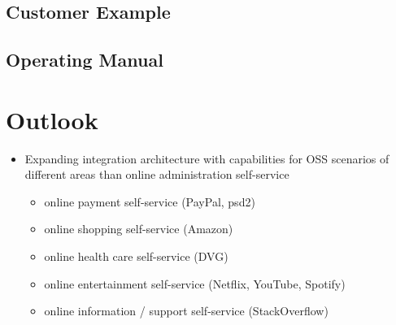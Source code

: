 \documentclass[
     12pt,         %
     a4paper,      %
     BCOR=10mm,version=first,     %
     DIV=14,version=first,        %
     ]{scrreprt}
\begin{document}
\section{Customer Example}

\section{Operating Manual}

\chapter{Outlook}

\begin{itemize}
     \item Expanding integration architecture with capabilities for OSS scenarios of different areas than online administration self-service
     \begin{itemize}
          \item online payment self-service (PayPal, psd2)
          \item online shopping self-service (Amazon)
          \item online health care self-service (DVG)
          \item online entertainment self-service (Netflix, YouTube, Spotify)
          \item online information / support self-service (StackOverflow)
     \end{itemize}
\end{itemize}

\printbibliography
\end{document}
